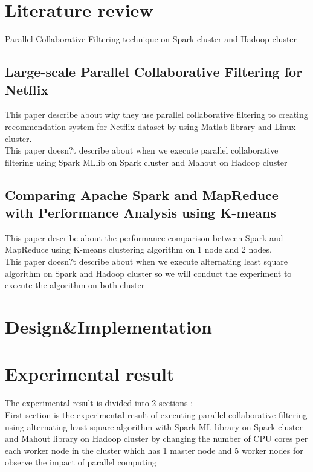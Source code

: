 \documentclass[conference]{IEEEtran}
\begin{document}
\section{Literature review}

\indent Parallel Collaborative Filtering technique on Spark cluster and Hadoop cluster
\subsection{Large-scale Parallel Collaborative Filtering for Netflix}
\indent This paper describe about why they use parallel collaborative filtering to creating recommendation system for Netflix dataset by using Matlab library and Linux cluster. \\
\indent This paper doesn?t describe about when we execute parallel collaborative filtering using Spark MLlib on Spark cluster and Mahout on Hadoop cluster

\subsection{Comparing Apache Spark and MapReduce with Performance Analysis using K-means}
\indent This paper describe about the performance comparison between Spark  and MapReduce using K-means clustering algorithm on 1 node and 2 nodes. \\
\indent This paper doesn?t describe about when we execute alternating least square algorithm on Spark and Hadoop cluster so we will conduct the experiment to execute the algorithm on both cluster

\section{Design\&Implementation}

\section{Experimental result}
\indent The experimental result is divided into 2 sections :\\
\indent First section is the experimental result of executing parallel collaborative filtering using alternating least square algorithm with Spark ML library on Spark cluster and Mahout library on Hadoop cluster by changing the number of CPU cores per each worker node in the cluster which has 1 master node and 5 worker nodes for observe the impact of parallel computing\\
\end{document}
